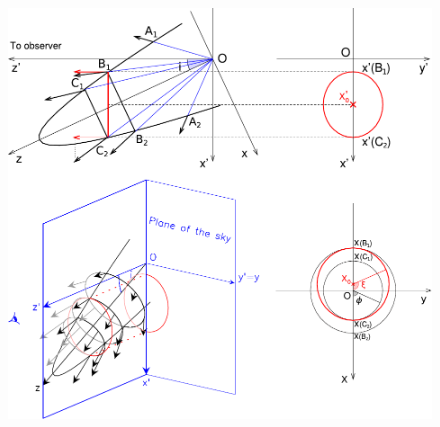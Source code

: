 \documentclass[12pt]{mythesis}
\begin{document}
\begin{figure}[p!] 
\includegraphics[width=\textwidth]{figures/geometry_ballistic.pdf}\\
 \label{fig:scheme}
\end{figure}
\end{document}
